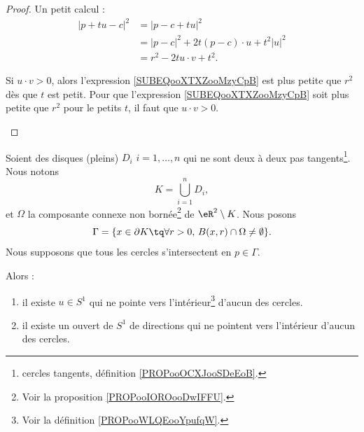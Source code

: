 \begin{proof}
	Un petit calcul :
	\begin{subequations}
		\begin{align}
			| p+tu-c |^2 & =| p-c+tu |^2                                     \\
			             & =| p-c |^2+2t(p-c)\cdot u+t^2| u |^2              \\
			             & =r^2-2tu\cdot v+t^2.		\label{SUBEQooXTXZooMzyCpB}
		\end{align}
	\end{subequations}
	\begin{subproof}
		\spitem[\( \Rightarrow\)]
		Si \( u\cdot v>0\), alors l'expression \eqref{SUBEQooXTXZooMzyCpB} est plus petite que \( r^2\) dès que \( t\) est petit.
		\spitem[\( \Leftarrow\)]
		Pour que l'expression \eqref{SUBEQooXTXZooMzyCpB} soit plus petite que \( r^2\) pour le petits \( t\), il faut que \( u\cdot v>0\).
	\end{subproof}
\end{proof}


\begin{proposition}	\label{PROPooCYYSooHVnjDl}
	Soient des disques (pleins) \( D_i\) \( i=1,\ldots,n\) qui ne sont deux à deux pas tangents\footnote{cercles tangents, définition \ref{PROPooOCXJooSDeEoB}.}. Nous notons
	\begin{equation}
		K=\bigcup_{i=1}^nD_i,
	\end{equation}
	et \( \Omega\) la composante connexe non bornée\footnote{Voir la proposition \ref{PROPooIOROooDwIFFU}.} de \( \eR^2\setminus K\). Nous posons
	\begin{equation}
		\Gamma=\{ x\in\partial K\tq \forall r>0,\,B(x,r)\cap\Omega\neq\emptyset \}.
	\end{equation}
	Nous supposons que tous les cercles s'intersectent en \( p\in \Gamma\).

	Alors :
	\begin{enumerate}
		\item		\label{ITEMooBQWZooEJuptl}
		      il existe \( u\in S^1\) qui ne pointe vers l'intérieur\footnote{Voir la définition \ref{PROPooWLQEooYpufqW}.} d'aucun des cercles.
		\item		\label{ITEMooAKPPooVyhNfC}
		      il existe un ouvert de \(S^1\) de directions qui ne pointent vers l'intérieur d'aucun des cercles.
	\end{enumerate}
\end{proposition}

